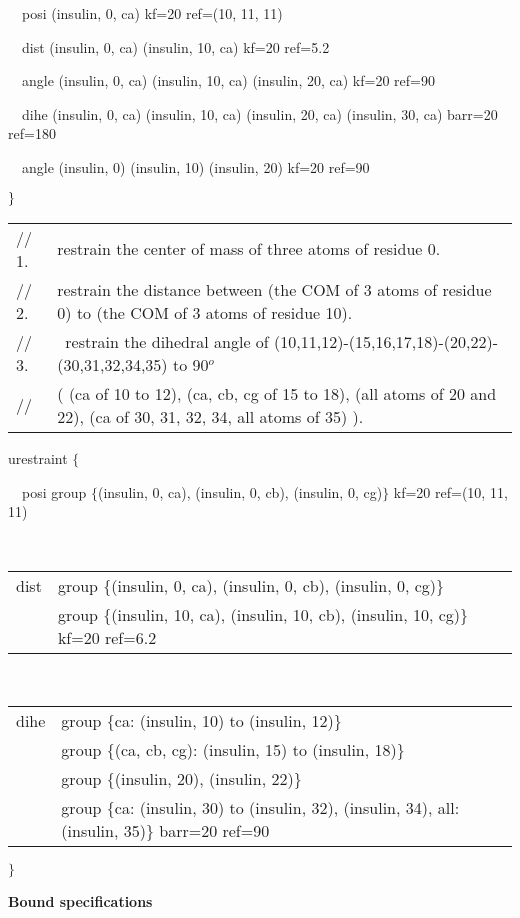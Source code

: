 ~~posi (insulin, 0, ca) kf=20 ref=(10, 11, 11)

~~dist (insulin, 0, ca) (insulin, 10, ca) kf=20 ref=5.2

~~angle (insulin, 0, ca) (insulin, 10, ca) (insulin, 20, ca) kf=20 ref=90

~~dihe (insulin, 0, ca) (insulin, 10, ca) (insulin, 20, ca) (insulin, 30,
ca) barr=20 ref=180

~~angle (insulin, 0) (insulin, 10) (insulin, 20) kf=20 ref=90

$\}\bigskip $

\begin{tabular}{ll}
{\footnotesize // 1. } & {\footnotesize restrain the center of mass of three
atoms of residue 0.} \\ 
{\footnotesize // 2.} & {\footnotesize restrain the distance between (the
COM of 3 atoms of residue 0) to  (the COM of 3 atoms of residue 10).} \\ 
{\footnotesize // 3.} & {\footnotesize \ restrain the dihedral angle of
(10,11,12)-(15,16,17,18)-(20,22)-(30,31,32,34,35) to 90}$^{o}$ \\ 
{\footnotesize //} & {\footnotesize ( (ca of 10 to 12), (ca, cb, cg of 15 to
18), (all atoms of 20 and 22), (ca of 30, 31, 32, 34, all atoms of 35) ).}
\end{tabular}

urestraint $\{$

~~posi group $\{$(insulin, 0, ca), (insulin, 0, cb), (insulin, 0, cg)$\}$
kf=20 ref=(10, 11, 11)

~~
\begin{tabular}{ll}
dist & group $\{$(insulin, 0, ca), (insulin, 0, cb), (insulin, 0, cg)$\}$ \\ 
& group $\{$(insulin, 10, ca), (insulin, 10, cb), (insulin, 10, cg)$\}$
kf=20 ref=6.2
\end{tabular}

~~
\begin{tabular}{ll}
dihe & group $\{$ca: (insulin, 10) to (insulin, 12)$\}$ \\ 
& group $\{$(ca, cb, cg): (insulin, 15) to (insulin, 18)$\}$ \\ 
& group $\{$(insulin, 20), (insulin, 22)$\}$ \\ 
& group $\{$ca: (insulin, 30) to (insulin, 32), (insulin, 34), all:
(insulin, 35)$\}$ barr=20 ref=90
\end{tabular}

$\}$

{\bf Bound specifications}

